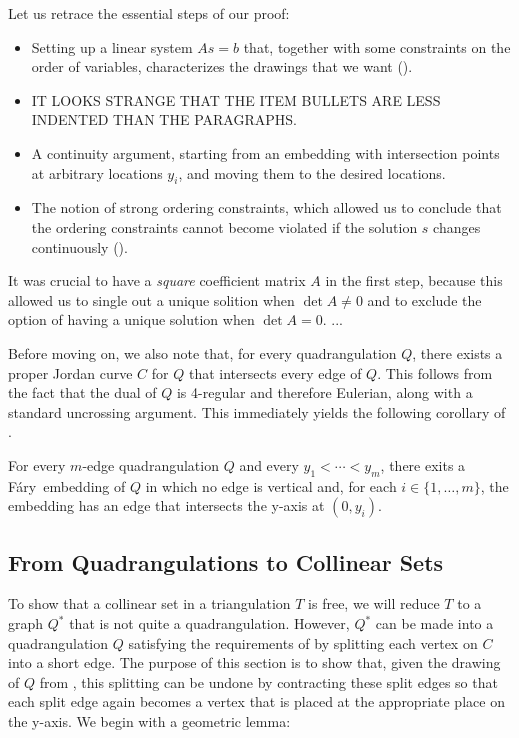\documentclass{patmorin}
\newcommand{\Fary}{Fáry}
\begin{document}
Let us retrace the essential steps of our proof:
\begin{itemize}
\item Setting up a %
linear system $As=b$ that, together
with some constraints on the order of variables, characterizes the
drawings
that we want ().
\item 
IT LOOKS STRANGE THAT THE ITEM BULLETS ARE LESS INDENTED THAN THE
PARAGRAPHS.
\item A continuity argument, starting from an embedding with
 intersection points at arbitrary locations $y_i$, and moving them
 to the desired locations.
\item The notion of strong
 ordering constraints, which allowed us to conclude
 that the ordering constraints cannot become violated if
the solution $s$ changes continuously
().
\end{itemize}
It was crucial to have a \emph{square} coefficient matrix $A$ in the
first step, because this allowed us to
single out a unique solition when $\det A\ne0$ and to
 exclude the option of having a
unique solution when $\det A=0$.  ...

Before moving on, we also note that, for every quadrangulation $Q$, there
exists a proper Jordan curve $C$ for $Q$ that intersects every edge
of $Q$. This follows from the fact that the dual of $Q$ is 4-regular
and therefore Eulerian, along with a standard uncrossing argument.
This immediately yields the following corollary of .

\begin{cor}
  For every $m$-edge quadrangulation $Q$ and every $y_1<\cdots<y_m$,
  there exits a \Fary\ embedding of $Q$ in which no edge is
  vertical and, for each $i\in\{1,\ldots,m\}$, the embedding has an edge
  that intersects the y-axis at $(0,y_i)$.
\end{cor}

\subsection{From Quadrangulations to Collinear Sets}

To show that a collinear set in a triangulation $T$ is free, we will
reduce $T$ to a graph $Q^*$ that is not quite a quadrangulation.  However,
$Q^*$ can be made into a quadrangulation $Q$ satisfying the requirements
of  by splitting each vertex on $C$ into a short edge. The
purpose of this section is to show that, given the drawing of $Q$ from
, this splitting can be undone by contracting these split
edges so that each split edge again becomes a vertex that is placed at
the appropriate place on the y-axis.  We begin with a geometric lemma:
\end{document}
